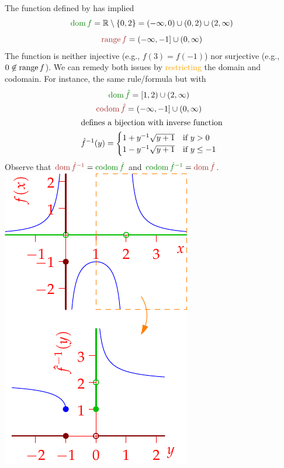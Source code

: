 \begin{example}[lower separated=false, sidebyside, sidebyside align=top seam, sidebyside gap=0pt, righthand width=0.32\linewidth]{}{}
	The function defined by  has implied
	\begin{gather*}
		\textcolor{Green}{\dom f}=\R\setminus\{0,2\}=(-\infty,0)\cup(0,2)\cup (2,\infty)\\[5pt]
		\textcolor{Brown}{\range f}=(-\infty,-1]\cup(0,\infty)
	\end{gather*}
	The function is neither injective (e.g., $f(3)=f(-1)$) nor surjective (e.g., $0\not\in\operatorname{range} f$).\smallbreak
	We can remedy both issues by \textcolor{orange}{restricting} the domain and codomain. For instance, the same rule/formula but with
	\begin{gather*}
		\textcolor{Green}{\dom\hat f}=[1,2)\cup(2,\infty)\\
		\textcolor{Brown}{\codom\hat f}=(-\infty,-1]\cup(0,\infty)\\
		\intertext{defines a bijection with inverse function}
		\hat f^{-1}(y)=
		\begin{cases}
			1+y^{-1}\sqrt{y+1}&\text{if }y>0\\
			1-y^{-1}\sqrt{y+1}&\text{if }y\le -1
		\end{cases}
	\end{gather*}
	Observe that $\textcolor{Brown}{\dom\hat f^{-1}}=\textcolor{Green}{\codom\hat f}$ and $\textcolor{Green}{\codom\hat f^{-1}}=\textcolor{Brown}{\dom\hat f}$.
	\tcblower
	\flushright\includegraphics[scale=0.95]{dom4}
\end{example}


